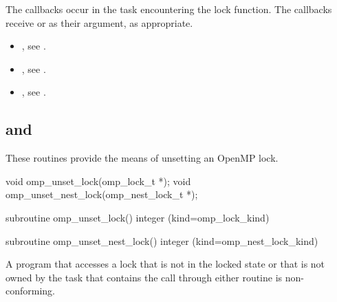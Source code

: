 The callbacks occur in the task encountering
the lock function.  The callbacks receive  or 
  as their  argument, as appropriate.


\crossreferences
\begin{itemize}
\item {}, see 
.
\item {}, see 
.
\item {}, see
.
\end{itemize}




\subsection{ and }
\label{subsec:omp_unset_lock and omp_unset_nest_lock}
\summary
These routines provide the means of unsetting an OpenMP lock.

\format
\begin{ccppspecific}
\begin{boxedcode}
void omp\_unset\_lock(omp\_lock\_t *);
void omp\_unset\_nest\_lock(omp\_nest\_lock\_t *);
\end{boxedcode}
\end{ccppspecific}

\begin{fortranspecific}
\begin{boxedcode}
subroutine omp\_unset\_lock()
integer (kind=omp\_lock\_kind) 

subroutine omp\_unset\_nest\_lock()
integer (kind=omp\_nest\_lock\_kind) 
\end{boxedcode}
\end{fortranspecific}

\constraints
A program that accesses a lock that is not in the locked state or that is 
not owned by the task that contains the call through either routine is 
non-conforming.


